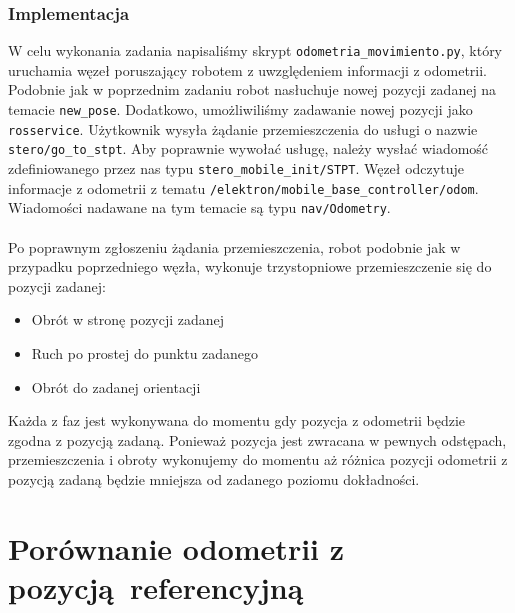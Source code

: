 \documentclass{mwrep}
\begin{document}
\subsubsection{Implementacja}
W celu wykonania zadania napisaliśmy skrypt \texttt{odometria\_{}movimiento.py}, który uruchamia węzeł
poruszający robotem z uwzględeniem informacji z odometrii. Podobnie jak w poprzednim zadaniu robot nasłuchuje
nowej pozycji zadanej na temacie \texttt{new\_{}pose}. Dodatkowo, umożliwiliśmy zadawanie nowej pozycji jako 
\texttt{rosservice}. Użytkownik wysyła żądanie przemieszczenia do usługi o nazwie \texttt{stero/go\_{}to\_{}stpt}.
Aby poprawnie wywołać usługę, należy wysłać wiadomość zdefiniowanego przez nas typu \texttt{stero\_{}mobile\_{}init/STPT}.
Węzeł odczytuje informacje z odometrii 
z tematu \texttt{/elektron/mobile\_{}base\_{}controller/odom}. Wiadomości nadawane na tym temacie są typu \texttt{nav/Odometry}.\\
\\
\indent{} Po poprawnym zgłoszeniu żądania przemieszczenia, robot podobnie jak w przypadku poprzedniego węzła, 
wykonuje trzystopniowe przemieszczenie się do pozycji zadanej:\\
\begin{itemize}
	\item Obrót w stronę pozycji zadanej
	\item Ruch po prostej do punktu zadanego
	\item Obrót do zadanej orientacji\\
\end{itemize}

Każda z faz jest wykonywana do momentu gdy pozycja z odometrii będzie zgodna z pozycją zadaną. Ponieważ pozycja jest 
zwracana w pewnych odstępach, przemieszczenia i obroty wykonujemy do momentu aż różnica pozycji odometrii z pozycją
zadaną będzie mniejsza od zadanego poziomu dokładności.

\section{Porównanie odometrii z pozycją referencyjną}
\label{lab1_comparision}
\end{document}
